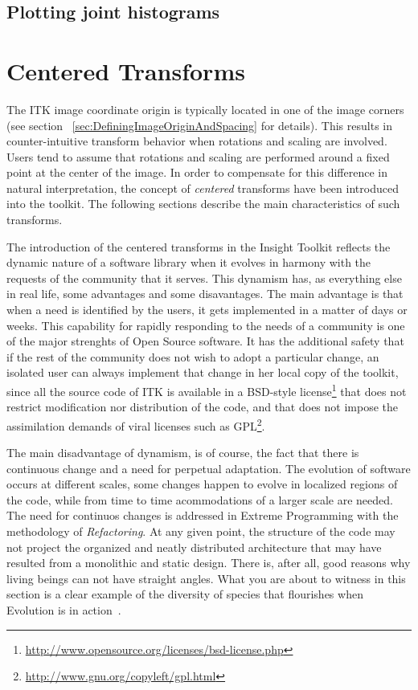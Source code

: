 \subsection{Plotting joint histograms}
\label{sec:JointHistograms}
\ifitkFullVersion

\fi


\section{ Centered Transforms }

The ITK image coordinate origin is typically located in one of the image
corners (see section ~\ref{sec:DefiningImageOriginAndSpacing} for details).
This results in counter-intuitive transform behavior when rotations and scaling
are involved. Users tend to assume that rotations and scaling are performed
around a fixed point at the center of the image.  In order to compensate for
this difference in natural interpretation, the concept of \emph{centered}
transforms have been introduced into the toolkit. The following sections
describe the main characteristics of such transforms.

The introduction of the centered transforms in the Insight Toolkit reflects the
dynamic nature of a software library when it evolves in harmony with the
requests of the community that it serves. This dynamism has, as everything else
in real life, some advantages and some disavantages. The main advantage is that
when a need is identified by the users, it gets implemented in a matter of days
or weeks.  This capability for rapidly responding to the needs of a community
is one of the major strenghts of Open Source software. It has the additional
safety that if the rest of the community does not wish to adopt a particular
change, an isolated user can always implement that change in her local copy of
the toolkit, since all the source code of ITK is available in a BSD-style
license\footnote{\url{http://www.opensource.org/licenses/bsd-license.php}} that
does not restrict modification nor distribution of the code, and that does not
impose the assimilation demands of viral licenses such as
GPL\footnote{\url{http://www.gnu.org/copyleft/gpl.html}}.

The main disadvantage of dynamism, is of course, the fact that there is
continuous change and a need for perpetual adaptation. The evolution of
software occurs at different scales, some changes happen to evolve in localized
regions of the code, while from time to time acommodations of a larger scale
are needed. The need for continuos changes is addressed in Extreme Programming
with the methodology of \emph{Refactoring}. At any given point, the structure
of the code may not project the organized and neatly distributed architecture
that may have resulted from a monolithic and static design. There is, after
all, good reasons why living beings can not have straight angles. What you are
about to witness in this section is a clear example of the diversity of species
that flourishes when Evolution is in action~\cite{Darwin1999}.



